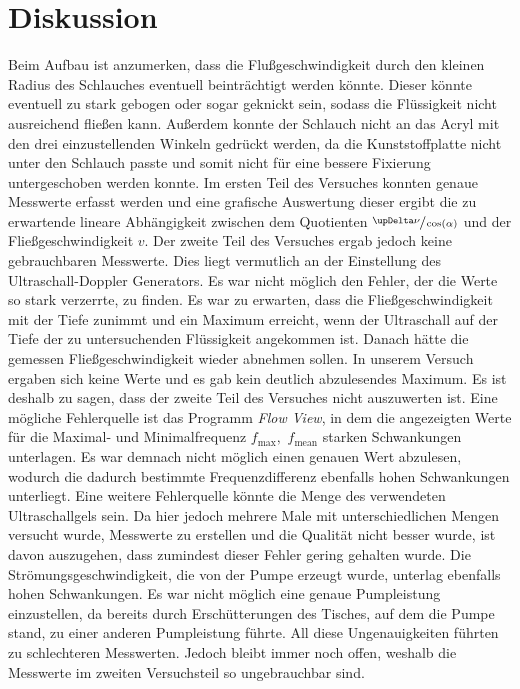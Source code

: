 \section{Diskussion}
\label{sec:Diskussion}

Beim Aufbau ist anzumerken, dass die Flußgeschwindigkeit durch den kleinen Radius des Schlauches eventuell beinträchtigt werden könnte.
Dieser könnte eventuell zu stark gebogen oder sogar geknickt sein, sodass die Flüssigkeit nicht ausreichend fließen kann.
Außerdem konnte der Schlauch nicht an das Acryl mit den drei einzustellenden Winkeln gedrückt werden, da die Kunststoffplatte nicht 
unter den Schlauch passte und somit nicht für eine bessere Fixierung untergeschoben werden konnte.\newline
Im ersten Teil des Versuches konnten genaue Messwerte erfasst werden und eine grafische Auswertung dieser ergibt die zu erwartende lineare Abhängigkeit
zwischen dem Quotienten $\sfrac{\upDelta\nu}{\cos(\alpha)}$ und der Fließgeschwindigkeit $v$. \newline
Der zweite Teil des Versuches ergab jedoch keine gebrauchbaren Messwerte. Dies liegt vermutlich an der Einstellung des Ultraschall-Doppler Generators.
Es war nicht möglich den Fehler, der die Werte so stark verzerrte, zu finden. Es war zu erwarten, dass die Fließgeschwindigkeit mit der Tiefe zunimmt
und ein Maximum erreicht, wenn der Ultraschall auf der Tiefe der zu untersuchenden Flüssigkeit angekommen ist. Danach hätte die gemessen 
Fließgeschwindigkeit wieder abnehmen sollen.
In unserem Versuch ergaben sich keine Werte und es gab kein deutlich abzulesendes Maximum. Es ist deshalb zu sagen, dass der zweite Teil des Versuches
nicht auszuwerten ist.\newline
Eine mögliche Fehlerquelle ist das Programm \textit{Flow View}, in dem die angezeigten Werte für die Maximal- und Minimalfrequenz $f_{\text{max}},\, \,f_{\text{mean}}$
starken Schwankungen unterlagen. Es war demnach nicht möglich einen genauen Wert abzulesen, wodurch die dadurch bestimmte Frequenzdifferenz ebenfalls
hohen Schwankungen unterliegt.
Eine weitere Fehlerquelle könnte die Menge des verwendeten Ultraschallgels sein. Da hier jedoch mehrere Male mit unterschiedlichen Mengen versucht wurde, Messwerte
zu erstellen und die Qualität nicht besser wurde, ist davon auszugehen, dass zumindest dieser Fehler gering gehalten wurde.
Die Strömungsgeschwindigkeit, die von der Pumpe erzeugt wurde, unterlag ebenfalls hohen Schwankungen. Es war nicht möglich eine genaue Pumpleistung
einzustellen, da bereits durch Erschütterungen des Tisches, auf dem die Pumpe stand, zu einer anderen Pumpleistung führte.
All diese Ungenauigkeiten führten zu schlechteren Messwerten. Jedoch bleibt immer noch offen, weshalb die Messwerte im zweiten Versuchsteil so ungebrauchbar sind.

